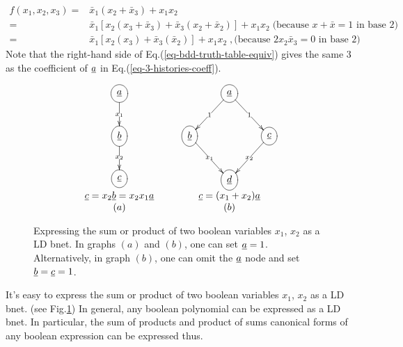 \begin{align}
f(x_1, x_2,x_3) =&
\bar{x}_1(x_2+\bar{x}_3)  + x_1 x_2
\\
=&
\bar{x}_1[x_2(x_3+\bar{x}_3)+\bar{x}_3
(x_2+ \bar{x}_2)]  + x_1 x_2
\;\text{(because $x+\bar{x}=1$ in base 2)}
\\
=&
\bar{x}_1[x_2(x_3)+\bar{x}_3
(\bar{x}_2)]  + x_1 x_2\;, \text{
(because $2x_2\bar{x}_3=0$ in base 2)
}
\label{eq-bdd-truth-table-equiv}
\end{align}
Note that the right-hand side of Eq.(\ref{eq-bdd-truth-table-equiv})
gives the same 3 
as the coefficient of $\rva$ in
 Eq.(\ref{eq-3-histories-coeff}).

\begin{figure}[h!]
$$
\begin{array}{ccc}
\xymatrix{
\Circle{\rva}
\ar[d]|{x_1}
\\
\Circle{\rvb}
\ar[d]|{x_2}
\\
\Circle{\rvc}
}
&\;\;\;&
\xymatrix{
&\Circle{\rva}\ar[dl]|1
\ar[dr]|1
\\
\Circle{\rvb}\ar[dr]|{x_1}
&&\Circle{\rvc}\ar[dl]|{x_2}
\\
&\Circle{\rvd}
}
\\
\rvc=x_2\rvb=x_2x_1\rva
&&
\rvc= (x_1 + x_2)\rva
\\
(a)&&(b)
\end{array}
$$
\caption{Expressing the sum or product
of two boolean variables $x_1$, $x_2$
as a LD bnet. In graphs $(a)$ and $(b)$,
one can set $\rva=1$. Alternatively,
in graph $(b)$, one  can
omit the $\rva$ node and set $\rvb=\rvc=1$.}
\label{fig-bdd-and-or}
\end{figure}

It's easy to  express the sum or product
of two boolean variables $x_1$, $x_2$
as a LD bnet.
(see Fig.\ref{fig-bdd-and-or})
In general, any boolean polynomial
can be expressed as a LD bnet. In particular, the sum of products and product of sums
canonical forms
of any boolean expression can be expressed
thus.
